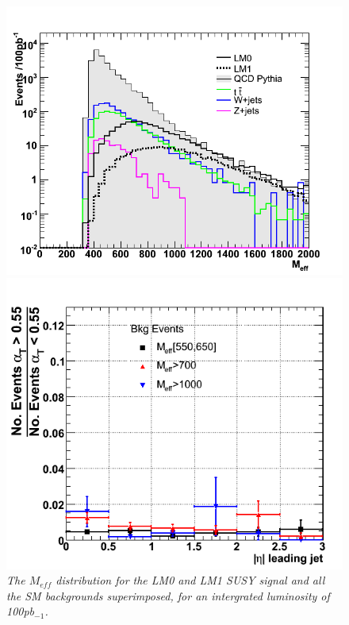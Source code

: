 \begin{figure}[h!]
\centering
\includegraphics[scale=0.3]{./plots/Meff-NT7-Dist.png}
\caption{\small{\textit{The $M_{eff}$ distribution for the LM0 and LM1 SUSY signal and all the SM backgrounds superimposed, for an intergrated luminosity of 100pb$_{-1}$.}}}
\label{fig:meff1}
\includegraphics[scale=0.4]{./plots/Meff-NT7-Bkg-MCerr}

\end{figure}
